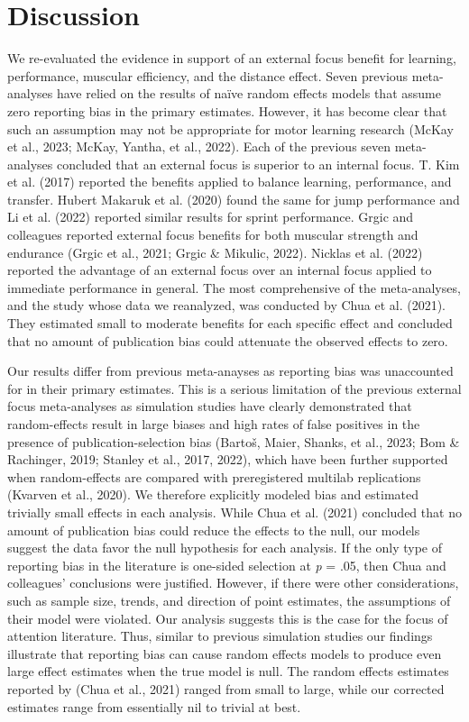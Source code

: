 \documentclass[
  man, donotrepeattitle,floatsintext]{apa7}
\begin{document}
\clearpage

\hypertarget{discussion}{%
\section{Discussion}\label{discussion}}

We re-evaluated the evidence in support of an external focus benefit for learning, performance, muscular efficiency, and the distance effect. Seven previous meta-analyses have relied on the results of naïve random effects models that assume zero reporting bias in the primary estimates. However, it has become clear that such an assumption may not be appropriate for motor learning research (McKay et al., 2023; McKay, Yantha, et al., 2022). Each of the previous seven meta-analyses concluded that an external focus is superior to an internal focus. T. Kim et al. (2017) reported the benefits applied to balance learning, performance, and transfer. Hubert Makaruk et al. (2020) found the same for jump performance and Li et al. (2022) reported similar results for sprint performance. Grgic and colleagues reported external focus benefits for both muscular strength and endurance (Grgic et al., 2021; Grgic \& Mikulic, 2022). Nicklas et al. (2022) reported the advantage of an external focus over an internal focus applied to immediate performance in general. The most comprehensive of the meta-analyses, and the study whose data we reanalyzed, was conducted by Chua et al. (2021). They estimated small to moderate benefits for each specific effect and concluded that no amount of publication bias could attenuate the observed effects to zero.

Our results differ from previous meta-anayses as reporting bias was unaccounted for in their primary estimates. This is a serious limitation of the previous external focus meta-analyses as simulation studies have clearly demonstrated that random-effects result in large biases and high rates of false positives in the presence of publication-selection bias (Bartoš, Maier, Shanks, et al., 2023; Bom \& Rachinger, 2019; Stanley et al., 2017, 2022), which have been further supported when random-effects are compared with preregistered multilab replications (Kvarven et al., 2020). We therefore explicitly modeled bias and estimated trivially small effects in each analysis. While Chua et al. (2021) concluded that no amount of publication bias could reduce the effects to the null, our models suggest the data favor the null hypothesis for each analysis. If the only type of reporting bias in the literature is one-sided selection at \emph{p} = .05, then Chua and colleagues' conclusions were justified. However, if there were other considerations, such as sample size, trends, and direction of point estimates, the assumptions of their model were violated. Our analysis suggests this is the case for the focus of attention literature. Thus, similar to previous simulation studies our findings illustrate that reporting bias can cause random effects models to produce even large effect estimates when the true model is null. The random effects estimates reported by (Chua et al., 2021) ranged from small to large, while our corrected estimates range from essentially nil to trivial at best.
\end{document}
